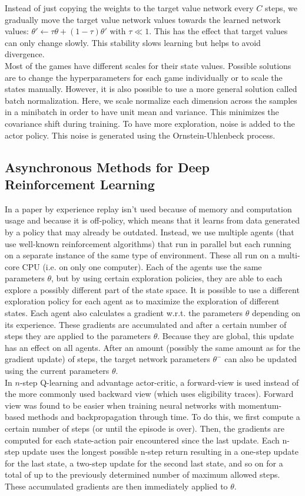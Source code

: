 \documentclass[a4paper]{article}
\begin{document}
Instead of just copying the weights to the target value network every $C$ steps, we gradually move the target value network values towards the learned network values: $\theta' \leftarrow \tau \theta + (1-\tau) \theta'$ with $\tau \ll 1$. This has the effect that target values can only change slowly. This stability slows learning but helps to avoid divergence.\\

Most of the games have different scales for their state values. Possible solutions are to change the hyperparameters for each game individually or to scale the states manually. However, it is also possible to use a more general solution called batch normalization. Here, we scale normalize each dimension across the samples in a minibatch in order to have unit mean and variance. This minimizes the covariance shift during training.
To have more exploration, noise is added to the actor policy. This noise is generated using the Ornstein-Uhlenbeck process.

\subsection{Asynchronous Methods for Deep Reinforcement Learning}
In a paper by \cite{Mnih2016AsynchronousLearning} experience replay isn't used because of memory and computation usage and because it is off-policy, which means that it learns from data generated by a policy that may already be outdated. Instead, we use multiple agents (that use well-known reinforcement algorithms) that run in parallel but each running on a separate instance of the same type of environment. These all run on a multi-core CPU (i.e. on only one computer). Each of the agents use the same parameters $\theta$, but by using certain exploration policies, they are able to each explore a possibly different part of the state space. It is possible to use a different exploration policy for each agent as to maximize the exploration of different states. Each agent also calculates a gradient w.r.t. the parameters $\theta$ depending on its experience. These gradients are accumulated and after a certain number of steps they are applied to the parameters $\theta$. Because they are global, this update has an effect on all agents. After an amount (possibly the same amount as for the gradient update) of steps, the target network parameters $\theta^{-}$ can also be updated using the current parameters $\theta$.\\
In $n$-step Q-learning and advantage actor-critic, a forward-view is used instead of the more commonly used backward view (which uses eligibility traces). Forward view was found to be easier when training neural networks with momentum-based methods and backpropagation through time. To do this, we first compute a certain number of steps (or until the episode is over). Then, the gradients are computed for each state-action pair encountered since the last update. Each n-step update uses the longest possible n-step return resulting in a one-step update for the last state, a two-step update for the second last state, and so on for a total of up to the previously determined number of maximum allowed steps. These accumulated gradients are then immediately applied to $\theta$.
\end{document}
